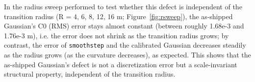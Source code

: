 In the radius sweep performed to test whether this defect is independent of the transition radius (R = 4, 6, 8, 12, 16 m; Figure~\ref{fig:rsweep}), the as-shipped Gaussian's C0 (RMS) error stays almost constant (between roughly 1.68e-3 and 1.76e-3 m), i.e. the error does not shrink as the transition radius grows; by contrast, the error of \texttt{smoothstep} and the calibrated Gaussian decreases steadily as the radius grows (as the curvature decreases), as expected. This shows that the as-shipped Gaussian's defect is not a discretization error but a scale-invariant structural property, independent of the transition radius.
